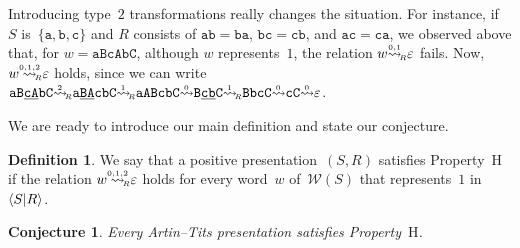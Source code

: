 \documentclass{amsart}
\numberwithin{equation}{section}
\theoremstyle{plain}
\newtheorem{conj}[prop]{Conjecture}
\theoremstyle{definition}
\newtheorem{defi}[prop]{Definition}
\begin{document}
Introducing type~$2$ transformations really changes the situation. For instance, if ${S}$ is~$\{{\mathtt{a}}, {\mathtt{b}}, {\mathtt{c}}\}$ and ${R}$ consists of ${\mathtt{a}} {\mathtt{b}} = {\mathtt{b}} {\mathtt{a}}$, ${\mathtt{b}} {\mathtt{c}} = {\mathtt{c}} {\mathtt{b}}$, and ${\mathtt{a}} {\mathtt{c}} = {\mathtt{c}} {\mathtt{a}}$, we observed above that, for ${w} = {\mathtt{a}} {\mathtt{B}} {\mathtt{c}} {\mathtt{A}} {\mathtt{b}} {\mathtt{C}}$, although ${w}$ represents~$1$, the relation ${w} {\mathrel{{\mathrel{\overset{\scriptscriptstyle 0,1}{\rightsquigarrow}}}_{\hspace{-0.4ex}{\scriptscriptstyle R}}}} {\varepsilon}$ fails. Now, ${w} {\mathrel{{\mathrel{\overset{\scriptscriptstyle 0,1,2}{\rightsquigarrow}}}_{\hspace{-0.9ex}{\scriptscriptstyle R}}}} {\varepsilon}$ holds, since we can write
${\mathtt{a}} {\mathtt{B}} \underline{{\mathtt{c}} {\mathtt{A}}} {\mathtt{b}} {\mathtt{C}}
{\overset{{}_{2}}{\rightsquigarrow}_{\hspace{-0.4ex}{\scriptscriptstyle R}}} {\mathtt{a}} \underline{{\mathtt{B}} {\mathtt{A}}} {\mathtt{c}} {\mathtt{b}} {\mathtt{C}}
{\overset{{}_{1}}{\rightsquigarrow}_{\hspace{-0.4ex}{\scriptscriptstyle R}}} {\mathtt{a}} {\mathtt{A}} {\mathtt{B}} {\mathtt{c}} {\mathtt{b}} {\mathtt{C}}
{\overset{{}_{0}}{\rightsquigarrow}} {\mathtt{B}} \underline{{\mathtt{c}} {\mathtt{b}}} {\mathtt{C}}
{\overset{{}_{1}}{\rightsquigarrow}_{\hspace{-0.4ex}{\scriptscriptstyle R}}} {\mathtt{B}} {\mathtt{b}} {\mathtt{c}} {\mathtt{C}}
{\overset{{}_{0}}{\rightsquigarrow}} {\mathtt{c}} {\mathtt{C}}
{\overset{{}_{0}}{\rightsquigarrow}} {\varepsilon}$.

We are ready to introduce our main definition and state our conjecture.

\begin{defi}
We say that a positive presentation~$({S}, {R})$ satisfies Property~${\mathrm{H}}$ if the relation ${w} {\mathrel{{\mathrel{\overset{\scriptscriptstyle 0,1,2}{\rightsquigarrow}}}_{\hspace{-0.9ex}{\scriptscriptstyle R}}}} {\varepsilon}$ holds for every word~${w}$ of~${\mathcal{W}({S})}$ that represents~$1$ in~${\langle{S}{\mid}\nobreak{R}\rangle}$.
\end{defi}

\begin{conj}
\label{C:Main}
Every Artin--Tits presentation satisfies Property~${\mathrm{H}}$.
\end{conj}
\end{document}
